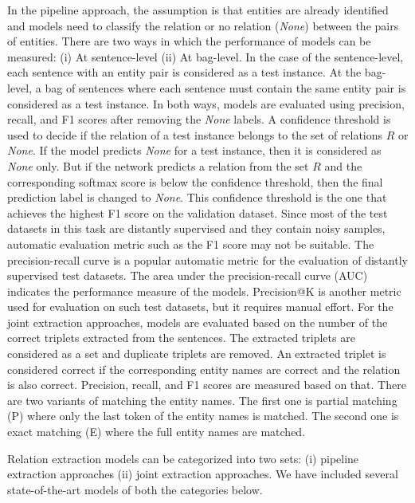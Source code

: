 In the pipeline approach, the assumption is that entities are already identified and models need to classify the relation or no relation ({\em None}) between the pairs of entities. There are two ways in which the performance of models can be measured: (i) At sentence-level (ii) At bag-level. In the case of the sentence-level, each sentence with an entity pair is considered as a test instance. At the bag-level, a bag of sentences where each sentence must contain the same entity pair is considered as a test instance. In both ways, models are evaluated using precision, recall, and F1 scores after removing the {\em None} labels. A confidence threshold is used to decide if the relation of a test instance belongs to the set of relations $R$ or {\em None}. If the model predicts {\em None} for a test instance, then it is considered as {\em None} only. But if the network predicts a relation from the set $R$ and the corresponding softmax score is below the confidence threshold, then the final prediction label is changed to {\em None}. This confidence threshold is the one that achieves the highest F1 score on the validation dataset. Since most of the test datasets in this task are distantly supervised and they contain noisy samples, automatic evaluation metric such as the F1 score may not be suitable. The precision-recall curve is a popular automatic metric for the evaluation of distantly supervised test datasets. The area under the precision-recall curve (AUC) indicates the performance measure of the models. Precision@K is another metric used for evaluation on such test datasets, but it requires manual effort. 
For the joint extraction approaches, models are evaluated based on the number of the correct triplets extracted from the sentences. The extracted triplets are considered as a set and duplicate triplets are removed. An extracted triplet is considered correct if the corresponding entity names are correct and the relation is also correct. Precision, recall, and F1 scores are measured based on that. There are two variants of matching the entity names. The first one is partial matching (P) where only the last token of the entity names is matched. The second one is exact matching (E) where the full entity names are matched.

Relation extraction models can be categorized into two sets: (i) pipeline extraction approaches (ii) joint extraction approaches. We have included several state-of-the-art models of both the categories below.

